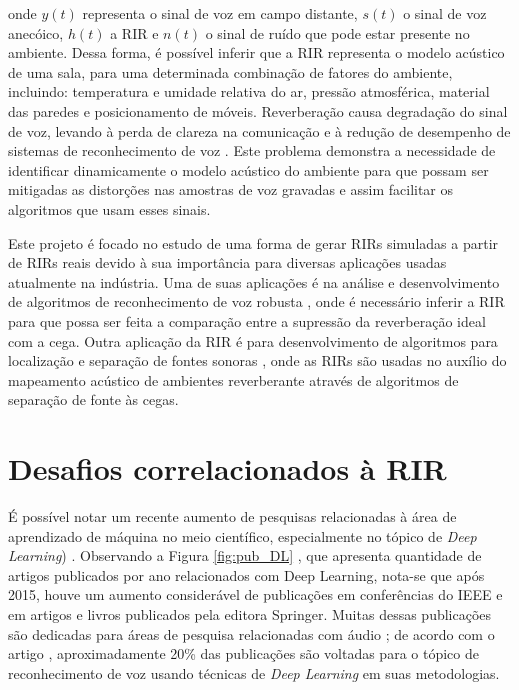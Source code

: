 \noindent
onde $y(t)$ representa o sinal de voz em campo distante, $s(t)$ o sinal de voz anecóico, $h(t)$ a RIR e $n(t)$ o sinal de ruído que pode
estar presente no ambiente.
Dessa forma, é possível inferir que a RIR representa o modelo acústico de uma sala, para uma determinada combinação de fatores do ambiente, incluindo: 
temperatura e umidade relativa do ar, pressão atmosférica, material das paredes e posicionamento de móveis.
Reverberação causa degradação do sinal de voz, levando à perda de clareza na comunicação \cite{Speech_intellig_hear} e à redução de desempenho
de sistemas de reconhecimento de voz \cite{reverb_sup_speech_reg}. Este problema demonstra a necessidade de identificar dinamicamente o modelo acústico
do ambiente para que possam ser mitigadas as distorções nas amostras de voz gravadas e assim facilitar os algoritmos que usam esses sinais.

Este projeto é focado no estudo de uma forma de gerar RIRs simuladas a partir de RIRs reais devido à sua importância para diversas
aplicações usadas atualmente na indústria. Uma de suas aplicações é na análise e desenvolvimento de algoritmos de 
reconhecimento de voz robusta \cite{reverb_sup_speech_reg}, onde é necessário inferir a RIR para que possa ser feita a comparação entre
a supressão da reverberação ideal com a cega.
Outra aplicação da RIR é para desenvolvimento de algoritmos para localização e separação de fontes sonoras \cite{Source_sep_RIR},
onde as RIRs são usadas no auxílio do mapeamento acústico de ambientes reverberante através de algoritmos de separação de fonte às cegas.

\section{Desafios correlacionados à RIR}

É possível notar um recente aumento de pesquisas relacionadas à área de aprendizado de máquina no meio científico, especialmente no tópico de 
\textit{Deep Learning}) \cite{Study_SR_DL}. Observando a Figura \ref{fig:pub_DL} \cite{Jounal_Awareness_DL}, que apresenta quantidade de artigos
publicados por ano relacionados com Deep Learning, nota-se que após 2015, houve um aumento 
considerável de publicações em conferências do IEEE e em artigos e livros publicados pela editora Springer\textregistered.
Muitas dessas publicações são dedicadas para áreas de pesquisa relacionadas com áudio \cite{Study_SR_DL, Speech_proc_plus_DL, Source_Sep_DL}; de acordo com o artigo \cite{Survey_DL}, aproximadamente 20\% 
das publicações são voltadas para o tópico de reconhecimento de voz usando técnicas de \textit{Deep Learning} em suas metodologias.

